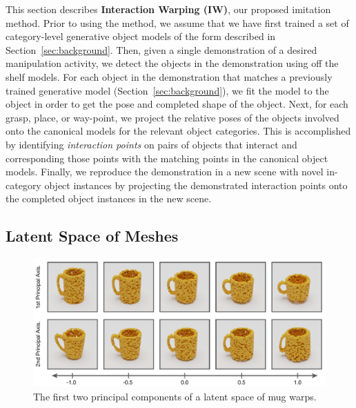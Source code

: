 \documentclass{article}
\begin{document}
This section describes \textbf{Interaction Warping (IW)}, our proposed imitation method. Prior to using the method, we assume that we have first trained a set of category-level generative object models of the form described in Section~\ref{sec:background}. Then, given a single demonstration of a desired manipulation activity, we detect the objects in the demonstration using off the shelf models. For each object in the demonstration that matches a previously trained generative model (Section~\ref{sec:background}), we fit the model to the object in order to get the pose and completed shape of the object. Next, for each grasp, place, or way-point, we project the relative poses of the objects involved onto the canonical models for the relevant object categories. This is accomplished by identifying \emph{interaction points} on pairs of objects that interact and corresponding those points with the matching points in the canonical object models. Finally, we reproduce the demonstration in a new scene with novel in-category object instances by projecting the demonstrated interaction points onto the completed object instances in the new scene.


\subsection{Latent Space of Meshes}
\label{sec:methods:mesh}

\begin{figure}
    \centering
    \includegraphics[width=\textwidth]{figures/latent_mugs2.pdf}
    \caption{The first two principal components of a latent space of mug warps.}
    \label{fig:latent}
\end{figure}
\end{document}
